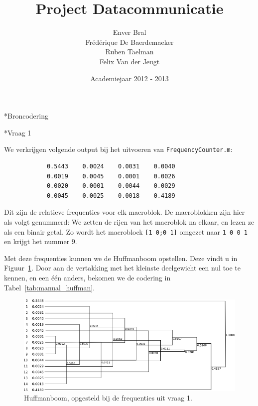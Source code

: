 \documentclass[]{article}
\title{Project Datacommunicatie}
\author{Enver Bral \\
        Fr\'ed\'erique De Baerdemaeker \\
        Ruben Taelman \\
        Felix Van der Jeugt}
\date{Academiejaar 2012 - 2013}
\begin{document}
\maketitle
\begin{section}*{Broncodering}

    \begin{subsection}*{Vraag 1}

        We verkrijgen volgende output bij het uitvoeren van
        \texttt{FrequencyCounter.m}:

        \begin{lstlisting}
            0.5443    0.0024    0.0031    0.0040
            0.0019    0.0045    0.0001    0.0026
            0.0020    0.0001    0.0044    0.0029
            0.0045    0.0025    0.0018    0.4189
        \end{lstlisting}

        Dit zijn de relatieve frequenties voor elk macroblok. De
        macroblokken zijn hier als volgt genummerd: We zetten de rijen
        van het macroblok na elkaar, en lezen ze als een binair getal.  Zo
        wordt het macroblock \texttt{[1 0;0 1]} omgezet naar
        \texttt{1 0 0 1} en krijgt het nummer $9$.

        Met deze frequenties kunnen we de Huffmanboom opstellen. Deze
        vindt u in Figuur~\ref{fig:manual_huffman}. Door aan de
        vertakking met het kleinste deelgewicht een nul toe te kennen,
        en een \'e\'en anders, bekomen we de codering in
        Tabel~\ref{tab:manual_huffman}.

        \begin{figure}
            \centering
            \includegraphics[width=\textwidth]{manual_huffman.png}
            \caption{Huffmanboom, opgesteld bij de frequenties uit
            \label{fig:manual_huffman}
            vraag 1.}
        \end{figure}


\end{subsection}
\end{section}
\end{document}
